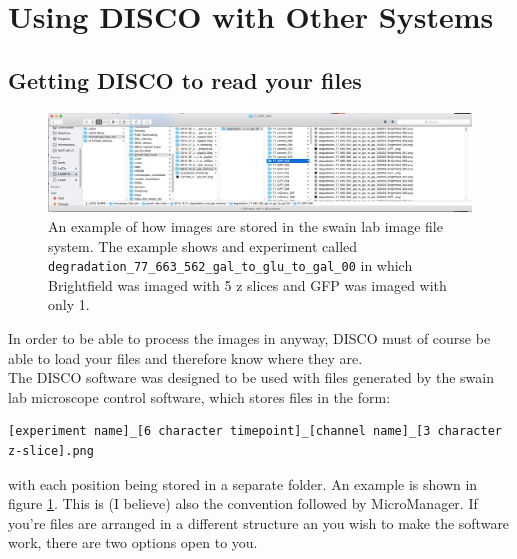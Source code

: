 \section{Using DISCO with Other Systems}
\label{sec:other_systems}

\subsection{Getting DISCO to read your files}
\begin{figure}
	\centering
	\includegraphics[width=1\linewidth]{documentation_images/other_systems-swain_file_structure}
	\caption[swain lab image file system]{An example of how images are stored in the swain lab image file system. The example shows and experiment called \texttt{degradation\_77\_663\_562\_gal\_to\_glu\_to\_gal\_00} in which Brightfield was imaged with 5 z slices and GFP was imaged with only 1. }
	\label{fig:other_systems-swain_file_structure}
\end{figure}
In order to be able to process the images in anyway, DISCO must of course be able to load your files and therefore know where they are.\\
The DISCO software was designed to be used with files generated by the swain lab microscope control software, which stores files in the form:
\begin{verbatim}
[experiment name]_[6 character timepoint]_[channel name]_[3 character z-slice].png
\end{verbatim}
with each position being stored in a separate folder. An example is shown in figure \ref{fig:other_systems-swain_file_structure}. This is (I believe) also the convention followed by MicroManager. If you're files are arranged in a different structure an you wish to make the software work, there are two options open to you.

